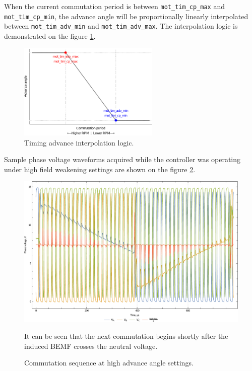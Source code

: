 \documentclass{zubaxdoc}
\begin{document}
When the current commutation period is between \verb|mot_tim_cp_max| and \verb|mot_tim_cp_min|,
the advance angle will be proportionally linearly interpolated between
\verb|mot_tim_adv_min| and \verb|mot_tim_adv_max|.
The interpolation logic is demonstrated on the figure \ref{timing_advance_interpolation_plot}.

\begin{figure}[hbt]
    \centering
	\includegraphics[width=0.6\textwidth]{timing_advance_interpolation_plot}
	\caption{Timing advance interpolation logic.
	\label{timing_advance_interpolation_plot}}
\end{figure}

Sample phase voltage waveforms acquired while the controller was operating under high field
weakening settings are shown on the figure \ref{phase_voltages_at_high_advance_angle}.

\begin{figure}[hbtp]
    \centering
	\includegraphics[width=\textwidth]{phase_voltages_at_high_advance_angle}
	\caption{Commutation sequence at high advance angle settings.
	\label{phase_voltages_at_high_advance_angle}}
	It can be seen that the next commutation begins shortly after the induced BEMF
	crosses the neutral voltage.
\end{figure}
\end{document}
